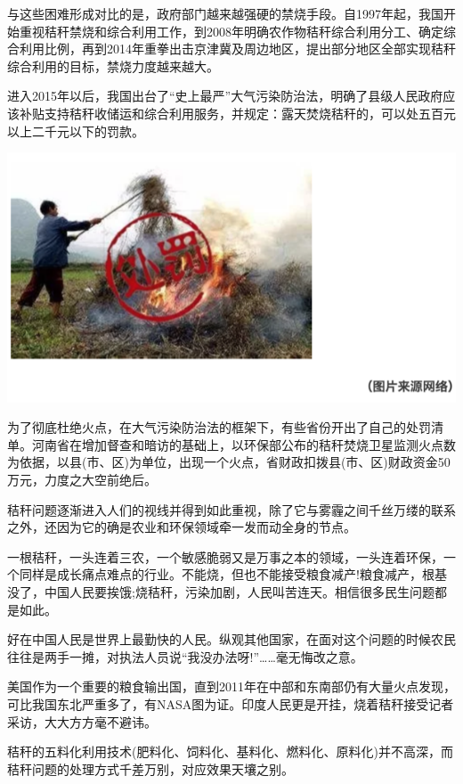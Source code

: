 \documentclass[]{book}
\begin{document}
与这些困难形成对比的是，政府部门越来越强硬的禁烧手段。自1997年起，我国开始重视秸秆禁烧和综合利用工作，到2008年明确农作物秸秆综合利用分工、确定综合利用比例，再到2014年重拳出击京津冀及周边地区，提出部分地区全部实现秸秆综合利用的目标，禁烧力度越来越大。

进入2015年以后，我国出台了``史上最严''大气污染防治法，明确了县级人民政府应该补贴支持秸秆收储运和综合利用服务，并规定：露天焚烧秸秆的，可以处五百元以上二千元以下的罚款。

\includegraphics[width=8.33in]{images/stalk3}

为了彻底杜绝火点，在大气污染防治法的框架下，有些省份开出了自己的处罚清单。河南省在增加督查和暗访的基础上，以环保部公布的秸秆焚烧卫星监测火点数为依据，以县(市、区)为单位，出现一个火点，省财政扣拨县(市、区)财政资金50万元，力度之大空前绝后。

秸秆问题逐渐进入人们的视线并得到如此重视，除了它与雾霾之间千丝万缕的联系之外，还因为它的确是农业和环保领域牵一发而动全身的节点。

一根秸秆，一头连着三农，一个敏感脆弱又是万事之本的领域，一头连着环保，一个同样是成长痛点难点的行业。不能烧，但也不能接受粮食减产!粮食减产，根基没了，中国人民要挨饿;烧秸秆，污染加剧，人民叫苦连天。相信很多民生问题都是如此。

好在中国人民是世界上最勤快的人民。纵观其他国家，在面对这个问题的时候农民往往是两手一摊，对执法人员说``我没办法呀!''\ldots{}\ldots{}毫无悔改之意。

美国作为一个重要的粮食输出国，直到2011年在中部和东南部仍有大量火点发现，可比我国东北严重多了，有NASA图为证。印度人民更是开挂，烧着秸秆接受记者采访，大大方方毫不避讳。

秸秆的五料化利用技术(肥料化、饲料化、基料化、燃料化、原料化)并不高深，而秸秆问题的处理方式千差万别，对应效果天壤之别。
\end{document}
